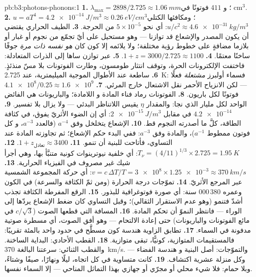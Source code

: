\begin{solution}{pb:b3:photons-phonons:1}
\textbf{1.} $\lambda_{\max} = 2898/2.725 \approx \qty{1.06}{mm}$؛ و
$411$ فوتونًا في cm$^3$.
\textbf{2.} $u = aT^4 = \qty{4.2e-14}{J/m^3} \approx
\qty{0.26}{eV/cm^3}$؛ ومكافئها الكتلي $u/c^2 \approx
\qty{4.6e-31}{kg/m^3}$: أي نحو $5\times10^{-5}$ من الحرجة.
\textbf{3.} الطيف الحراري يقتضي أن يكون المصدر والإشعاع قد
توازنا --- وهو مستحيل على أيّ تجمّع من نجوم أو
غبار أو بلازما مضافةٍ على خطوط رؤية مختلفة؛ ولا يلائمه إلا
كون كان \emph{هو نفسه ذات مرة} جوفًا ساخنًا معتمًا.
\textbf{4.} $1 + z = 3000/2.725 \approx 1100$.
\textbf{5.} عبر توازن ساها إلى الذرات المتعادلة: فاختفت
الإلكترونات الحرة، وتوقف انتثار طومسون، وطارت الفوتونات
بلا مسّ منذئذٍ.
\textbf{6.} ساطعة عند الأطوال الموجية الميليمترية، عند
\qty{2.725}{K}: فسماء أولبرز \emph{مشتعلة} فعلًا --- لكن الانزياح الأحمر نقل
الاشتعال خارج المرئي.
\textbf{7.} $\num{4.1e8}/0.25 \approx \num{1.6e9}$ فوتونًا لكل
باريون.
\textbf{8.} الفوتونات رماد فناء المادة و
اللامادة؛ والباريونات هي الفائض الواحد لكل مليار الذي
نجا: والمقدار $\eta$ يقيس اللاتناظر البدئي --- ولا يزال
بلا تفسير.
\textbf{9.} $\qty{4.2e-14}{}$ في مقابل $\qty{2e-15}{J/m^3}$: أي إن
الضوء الأثريّ يفوق، في كثافة الطاقة، كلَّ ما أصدرته النجوم
قط.
\textbf{10.} الإشعاع يتخلخل وفق $a^{-4}$ (فالعدد $a^{-3}$، و
كل فوتون ممطوط $a^{-1}$)، والمادة وفق $a^{-3}$: ففي البدء
حكم الإشعاع؛ ثم تجاوزته المادة عند التساوي، فأتاحت للبنية
أن تنمو.
\textbf{11.} $1 + z_{\text{تعادل}} \approx 3400$.
\textbf{12.} $T_\nu = (4/11)^{1/3} \times 2.725 =
\qty{1.95}{K}$: أي خلفية نيوترينوات كونية متنبَّأ بها، وهي
أجرأ شيك غير مصروف في الفيزياء الحرارية.
\textbf{13.} $v = c\,\Delta T/T = \num{3e8} \times \num{1.25e-3}
\approx \qty{370}{km/s}$: أي حركة المجموعة الشمسية عبر
المرجع الأثريّ.
\textbf{14.} تموّجات درجة الحرارة (ومن ثمّ الكثافة والسرعة)
في الكون وعمره 380\,000 سنة: أي صورة فوتوغرافية
للبذور.
\textbf{15.} الرقع المفرطة الكثافة تجذب أشدّ فتنمو (وهو عدم
الاستقرار الثقالي)؛ وقبل التساوي كان ضغط الإشعاع
يردّها إلى الوراء --- فانتظر النموّ أن تحكم المادة.
\textbf{16.} المسافة التي قطعها الصوت ($c/\sqrt3$ في مائع
الفوتونات والباريونات) حتى إعادة الالتحام --- وهو أفق
الصوت، أي مسطرة صوتية مدفونة في السماء.
\textbf{17.} تطابق الزاوية هندسة كون مسطَّح في حدود
واحد بالمئة تقريبًا: فالمستقيمات المتوازية، كونيًّا، تبقى متوازية.
\textbf{18.} القطب الأحادي: البداية الساخنة. والقطب الثنائي: سرعتنا
البالغة \qty{370}{km/s}. والتموّجات: أصل البنية و
هندسة الفضاء --- وكل منزلة عشرية اكتشاف.
\textbf{19.} كانت متساوية في كل اتجاه، ليلًا ونهارًا،
صيفًا وشتاءً، وبلا حمام: فلا شيء محلي أو مجرّي أو
جهازي بهذا التماثل المناحي --- إلا السماء نفسها.

\end{solution}
